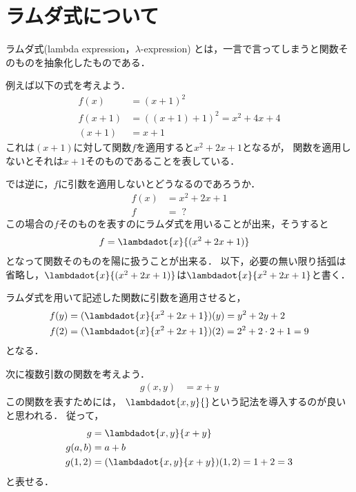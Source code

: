 \documentclass[a4paper,titlepage,report]{jsbook}
\begin{document}
\section{ラムダ式について}\label{sc:about-lambda-expression}
ラムダ式(lambda expression，$\lambda$-expression) とは，一言で言ってしまうと関数そのものを抽象化したものである．

例えば以下の式を考えよう．
\begin{align}
f(x) &= (x + 1)^2\\
f(x + 1) &= {\left((x + 1) + 1\right)}^2 = x^2 + 4x + 4\\
(x + 1) &= x + 1
\end{align}
これは$(x + 1)$に対して関数$f$を適用すると$x^2 + 2x + 1$となるが，
関数を適用しないとそれは$x + 1$そのものであることを表している．

では逆に，$f$に引数を適用しないとどうなるのであろうか．
\begin{align}
f(x) &= x^2 + 2x + 1\\
f    &= \;?
\end{align}
この場合の$f$そのものを表すのにラムダ式を用いることが出来，そうすると
\begin{align}
f &= \lambdadot{x}{(x^2 + 2x + 1)}
\end{align}
となって関数そのものを陽に扱うことが出来る．
以下，必要の無い限り括弧は省略し，$\lambdadot{x}{(x^2 + 2x + 1)}$は$\lambdadot{x}{x^2 + 2x + 1}$と書く．

ラムダ式を用いて記述した関数に引数を適用させると，
\begin{align}
f(y) &= (\lambdadot{x}{x^2 + 2x + 1})(y) = y^2 + 2y + 2 \\
f(2) &= (\lambdadot{x}{x^2 + 2x + 1})(2) = 2^2 + 2\cdot 2 + 1 = 9
\end{align}
となる．

次に複数引数の関数を考えよう．
\begin{align}
g(x, y) &= x + y
\end{align}
この関数を表すためには，
$\lambdadot{x,y}{}$という記法を導入するのが良いと思われる．
従って，
\begin{align}
\label{eq:lambda-multiple}
g &= \lambdadot{x,y}{x + y}\\
\label{eq:lambda-multiple-inst}
g(a, b) &= a + b\\
g(1, 2) &= (\lambdadot{x,y}{x + y})(1, 2) = 1 + 2 = 3
\end{align}
と表せる．
\end{document}
